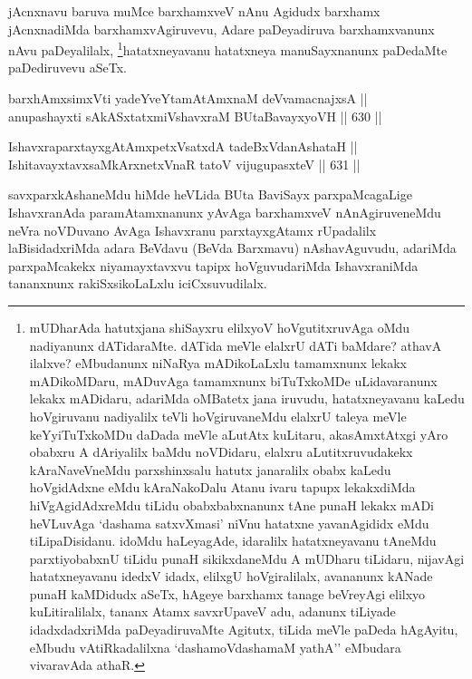 \begin{artha}
jAcnxnavu baruva muMce barxhamxveV nAnu Agidudx barxhamx jAcnxnadiMda
barxhamxvAgiruvevu, Adare paDeyadiruva barxhamxvanunx nAvu
paDeyalilalx, \footnote{mUDharAda hatutxjana shiSayxru elilxyoV hoVgutitxruvAga oMdu nadiyanunx dATidaraMte. dATida meVle elalxrU dATi baMdare? athavA ilalxve? eMbudanunx niNaRya mADikoLaLxlu tamamxnunx lekakx mADikoMDaru, mADuvAga tamamxnunx biTuTxkoMDe uLidavaranunx lekakx mADidaru, adariMda oMBatetx jana iruvudu, hatatxneyavanu kaLedu hoVgiruvanu nadiyalilx teVli hoVgiruvaneMdu elalxrU taleya meVle keYyiTuTxkoMDu daDada meVle aLutAtx kuLitaru, akasAmxtAtxgi yAro obabxru A dAriyalilx baMdu noVDidaru, elalxru aLutitxruvudakekx kAraNaveVneMdu parxshinxsalu hatutx janaralilx obabx kaLedu hoVgidAdxne eMdu kAraNakoDalu Atanu ivaru tapupx lekakxdiMda hiVgAgidAdxreMdu tiLidu obabxbabxnanunx tAne punaH lekakx mADi heVLuvAga `dashama satxvXmasi' niVnu hatatxne yavanAgididx eMdu tiLipaDisidanu. idoMdu haLeyagAde, idaralilx hatatxneyavanu tAneMdu parxtiyobabxnU tiLidu punaH sikikxdaneMdu A mUDharu tiLidaru, nijavAgi hatatxneyavanu idedxV idadx, elilxgU hoVgiralilalx, avananunx kANade punaH kaMDidudx aSeTx, hAgeye barxhamx tanage beVreyAgi elilxyo kuLitiralilalx, tananx Atamx savxrUpaveV adu, adanunx tiLiyade idadxdadxriMda paDeyadiruvaMte Agitutx, tiLida meVle paDeda hAgAyitu, eMbudu vAtiRkadalilxna `dashamoVdashamaM yathA'' eMbudara vivaravAda athaR.}hatatxneyavanu hatatxneya manuSayxnanunx paDedaMte paDediruvevu aSeTx. 
\end{artha}

\begin{shl}
barxhAmxsimxVti yadeYveYtamAtAmxnaM deVvamacnajxsA || \\
anupashayxti sAkASxtatxmiVshavxraM BUtaBavayxyoVH \hfill || 630 ||  
\end{shl}

\begin{shl}
IshavxraparxtayxgAtAmxpetxVsatxdA tadeBxVdanAshataH || \\
IshitavayxtavxsaMkArxnetxVnaR tatoV vijugupasxteV \hfill || 631 ||  
\end{shl}

\begin{artha}
savxparxkAshaneMdu hiMde heVLida BUta BaviSayx parxpaMcagaLige
IshavxranAda paramAtamxnanunx yAvAga barxhamxveV nAnAgiruveneMdu neVra
noVDuvano AvAga Ishavxranu parxtayxgAtamx rUpadalilx laBisidadxriMda
adara BeVdavu (BeVda Barxmavu) nAshavAguvudu, adariMda parxpaMcakekx
niyamayxtavxvu tapipx hoVguvudariMda IshavxraniMda tananxnunx
rakiSxsikoLaLxlu iciCxsuvudilalx.
\end{artha}


